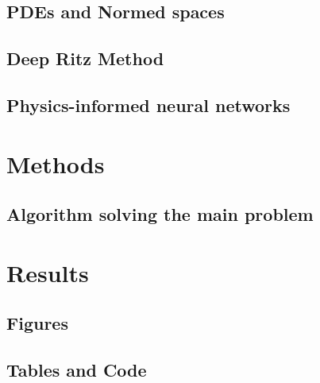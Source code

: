 \documentclass[a4paper,11pt,oneside]{article}
\numberwithin{equation}{section}
\numberwithin{table}{section}
\numberwithin{figure}{section}
\begin{document}
\subsection{PDEs and Normed spaces}


\subsection{Deep Ritz Method}


\subsection{Physics-informed neural networks}


% 



\section{Methods}
\label{sec:methods}



\subsection{Algorithm solving the main problem}




\section{Results}
\label{sec:results}



\subsection{Figures}



\subsection{Tables and Code}
\end{document}
